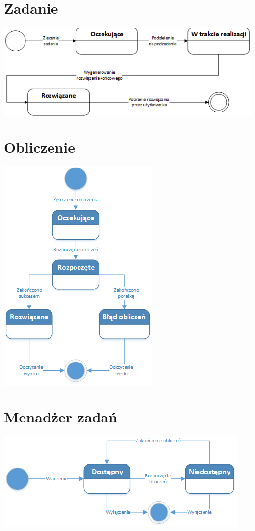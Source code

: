 \documentclass[12pt,a4paper,titlepage]{report}
\begin{document}
		\section{Zadanie}
		\includegraphics[width=\textwidth]{img/state/Task.png}
		
		\section{Obliczenie}
		\includegraphics{img/state/Calculation.png}
		
		\section{Menadżer zadań}
		\includegraphics[width=\textwidth]{img/state/TaskManager.png}
		
\end{document}
